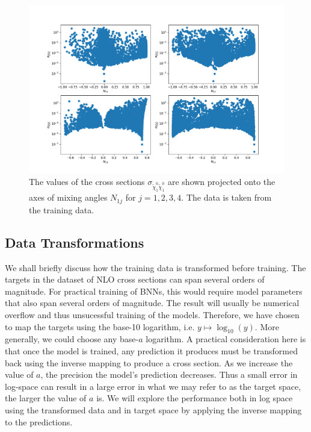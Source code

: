 \begin{figure}[h!]
    \centering
    \includegraphics[scale=0.5]{figures/dataset/mixing_angles.pdf}
    \caption{The values of the cross sections $\sigma_{\tilde{\chi}_1^0 \tilde{\chi}_1^0}$ are shown projected onto the axes of mixing angles $N_{1j}$ for $j = 1, 2, 3, 4$. The data is taken from the training data.
    }\label{fig:dataset_mixing_angles}
\end{figure}


\subsection{Data Transformations}\label{sec:data_transform}
We shall briefly discuss how the training data is transformed before training.
The targets in the dataset of NLO cross sections can span several orders of magnitude. For practical training of BNNs, this would require
model parameters that also span several orders of magnitude. The result will usually be numerical overflow and thus unsucessful training of the models.
Therefore, we have chosen to map the targets using the base-10 logarithm, i.e. $y \mapsto \log_{10}(y)$. More generally, we could choose any base-$a$ logarithm. A practical consideration here is that once the model is trained, any prediction it produces must be transformed back using
the inverse mapping to produce a cross section. As we increase the value of $a$, the precision the model's prediction decreases. Thus a small error in log-space 
can result in a large error in what we may refer to as the target space, the larger the value of $a$ is. 
We will explore the performance both in log space using the transformed data and in target space by applying the inverse mapping to the predictions.

